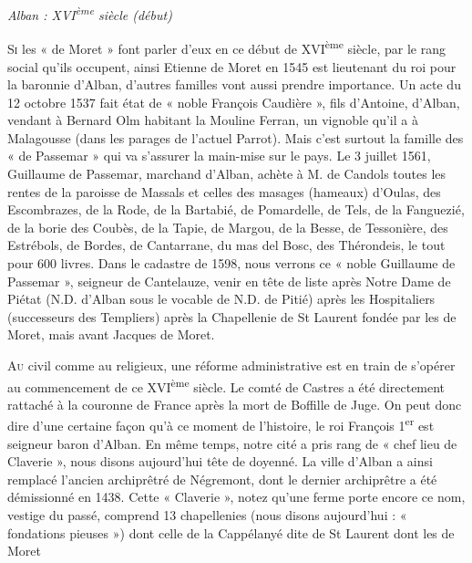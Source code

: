 
\begin{center}
  {\Large\itshape Alban : XVI\textsuperscript{ème} siècle (début)}
\end{center}

\vspace{1em}

\lettrine{S}{i} les « de Moret » font parler d'eux en ce début de XVI\textsuperscript{ème} siècle, par le rang social qu'ils occupent, ainsi Etienne de Moret en 1545 est lieutenant du roi pour la baronnie d'Alban, d'autres familles vont aussi prendre importance. Un acte du 12 octobre 1537 fait état de « noble François Caudière », fils d'Antoine, d'Alban, vendant à Bernard Olm habitant la Mouline Ferran, un vignoble qu'il a à Malagousse (dans les parages de l'actuel Parrot). Mais c'est surtout la famille des « de Passemar » qui va s'assurer la main-mise sur le pays. Le 3 juillet 1561, Guillaume de Passemar, marchand d'Alban, achète à M. de Candols toutes les rentes de la paroisse de Massals et celles des masages (hameaux) d'Oulas, des Escombrazes, de la Rode, de la Bartabié, de Pomardelle, de Tels, de la Fanguezié, de la borie des Coubès, de la Tapie, de Margou, de la Besse, de Tessonière, des Estrébols, de Bordes, de Cantarrane, du mas del Bosc, des Thérondeis, le tout pour 600 livres. Dans le cadastre de 1598, nous verrons ce « noble Guillaume de Passemar », seigneur de Cantelauze, venir en tête de liste après Notre Dame de Piétat (N.D. d'Alban sous le vocable de N.D. de Pitié) après les Hospitaliers (successeurs des Templiers) après la Chapellenie de St Laurent fondée par les de Moret, mais avant Jacques de Moret.

\medskip

\lettrine{A}{u} civil comme au religieux, une réforme administrative est en train de s'opérer au commencement de ce XVI\textsuperscript{ème} siècle. Le comté de Castres a été directement rattaché à la couronne de France après la mort de Boffille de Juge. On peut donc dire d'une certaine façon qu'à ce moment de l'histoire, le roi François 1\textsuperscript{er} est seigneur baron d'Alban. En même temps, notre cité a pris rang de « chef lieu de Claverie », nous disons aujourd'hui tête de doyenné. La ville d'Alban a ainsi remplacé l'ancien archiprêtré de Négremont, dont le dernier archiprêtre a été démissionné en 1438. Cette « Claverie », notez qu'une ferme porte encore ce nom, vestige du passé, comprend 13 chapellenies (nous disons aujourd'hui : « fondations pieuses ») dont celle de la Cappélanyé dite de St Laurent dont les de Moret

